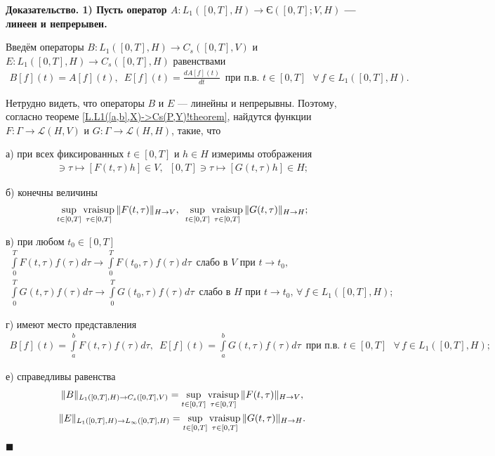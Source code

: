 \documentclass{report}
\newcounter{rem}[section]
\newcounter{theor}[section]
\newenvironment{Proof}{\par\noindent\bf Доказательство.\rm}{ $\blacksquare$\par}
\newcommand{\vraisup}{\mathop{\rm vraisup}}
\begin{document}
\begin{Proof}
1) Пусть оператор $A:L_1([0,T],H)\to\textrm{Є}([0,T];V,H)$ --- линеен и непрерывен.

Введём операторы $B:L_1([0,T],H)\to C_s([0,T],V)$ и $E:L_1([0,T],H)\to C_s([0,T],H)$ равенствами
\begin{gather*}
B[f](t)=A[f](t),\,\,\,E[f](t)=\frac{dA[f](t)}{dt}\,\,\,\text{при п.в. $t\in[0,T]$ }\forall\,f\in L_1([0,T],H).
\end{gather*}

Нетрудно видеть, что операторы $B$ и $E$ --- линейны и непрерывны. Поэтому, согласно теореме \ref{L.L1([a,b],X)->Cs(P,Y)!theorem}, найдутся функции $F:\Gamma\to\mathcal{L}(H,V)$ и
$G:\Gamma\to\mathcal{L}(H,H)$, такие, что

а) при всех фиксированных $t\in[0,T]$ и $h\in H$ измеримы отображения
\begin{gather*}
[0,T]\ni\tau\mapsto[F(t,\tau)h]\in V,\,\,\,[0,T]\ni\tau\mapsto[G(t,\tau)h]\in H;
\end{gather*}

б) конечны величины
$$
\sup\limits_{t\in[0,T]}\vraisup\limits_{\tau\in[0,T]}\|F(t,\tau)\|_{H\to V},\,\,\,\sup\limits_{t\in[0,T]}\vraisup\limits_{\tau\in[0,T]}\|G(t,\tau)\|_{H\to H};
$$

в) при любом $t_0\in[0,T]$
\begin{gather*}
\int\limits_0^TF(t,\tau)f(\tau)d\tau\to\int\limits_0^TF(t_0,\tau)f(\tau)d\tau\,\,\,\text{слабо в $V$ при $t\to t_0$, }\\
\int\limits_0^TG(t,\tau)f(\tau)d\tau\to\int\limits_0^TG(t_0,\tau)f(\tau)d\tau\,\,\,\text{слабо в $H$ при $t\to t_0$, }\forall\,f\in L_1([0,T],H);
\end{gather*}

г) имеют место представления
\begin{gather*}
B[f](t)=\int\limits_a^bF(t,\tau)f(\tau)d\tau,\,\,\,E[f](t)=\int\limits_a^bG(t,\tau)f(\tau)d\tau\,\,\,\text{при п.в. $t\in[0,T]$ }\forall\,f\in L_1([0,T],H);
\end{gather*}

е) справедливы равенства
\begin{gather*}
\|B\|_{L_1([0,T],H)\to C_s([0,T],V)}=\sup\limits_{t\in[0,T]}\vraisup\limits_{\tau\in[0,T]}\|F(t,\tau)\|_{H\to V},\\
\|E\|_{L_1([0,T],H)\to L_\infty([0,T],H)}=\sup\limits_{t\in[0,T]}\vraisup\limits_{\tau\in[0,T]}\|G(t,\tau)\|_{H\to H}.
\end{gather*}


\end{Proof}
\end{document}
